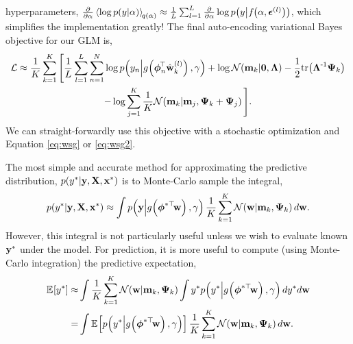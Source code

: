 \documentclass[11pt, oneside]{article}
\begin{document}
hyperparameters, $\frac{\partial}{\partial \alpha} \left\langle{\log
    \ensuremath{p\!\left({y}\middle\vert{\alpha}\right)}}\right\rangle_{\!{q(\alpha)}} \approx \frac{1}{L} \sum^L_{l=1}
\frac{\partial}{\partial\alpha} \log p\!\left({y}\middle\vert{\ensuremath{{f}_{}\!\left({{\alpha,
        \boldsymbol\epsilon^{(l)}}}\right)}}\right)$, which simplifies the implementation greatly! The
final auto-encoding variational Bayes objective for our GLM is,
\begin{multline}
    \mathcal{L} \approx \frac{1}{K} \sum^K_{k=1} \Bigg[
    \frac{1}{L} \sum^L_{l=1} \sum^N_{n=1} 
    \log p\!\left({y_n}\middle\vert{\ensuremath{{g}_{}\!\left({{\boldsymbol\phi_n^{\!\top} \hat{\mathbf{w}}_k^{\left({l}\right)}}}\right)}, \ensuremath{\gamma}}\right)
    + \log\mathcal{N}\!\left({\mathbf{m}_k}\middle\vert{\mathbf{0}, \ensuremath{\boldsymbol{\Lambda}}}\right)
    - \frac{1}{2} \text{tr}\!\left({\boldsymbol{\Lambda}^{\text{-}1}\boldsymbol{\Psi}_k}\right) \\
    - \log \sum_{j=1}^K \frac{1}{K}
    \mathcal{N}\!\left({\mathbf{m}_k}\middle\vert{\ensuremath{\mathbf{m}}_j, \ensuremath{\boldsymbol{\Psi}}_k + \ensuremath{\boldsymbol{\Psi}}_j}\right)
    \Bigg].
    \label{eq:glmobj_exp}
\end{multline}
We can straight-forwardly use this objective with a stochastic optimization
and Equation \eqref{eq:wsg} or \eqref{eq:wsg2}.

The most simple and accurate method for approximating the predictive
distribution, $p\!\left({y^{*}}\middle\vert{\ensuremath{\mathbf{y}}, \ensuremath{\mathbf{X}}, \ensuremath{\mathbf{x}}\ensuremath{^{*}}}\right)$ is to Monte-Carlo
sample the integral,
\begin{equation}
    p\!\left({y^{*}}\middle\vert{\ensuremath{\mathbf{y}}, \ensuremath{\mathbf{X}}, \ensuremath{\mathbf{x}}\ensuremath{^{*}}}\right) \approx
    \int p\!\left({\mathbf{y}}\middle\vert{\ensuremath{{g}_{}\!\left({{\boldsymbol\phi^{*\top}\!\mathbf{w}}}\right)}, \ensuremath{\gamma}}\right)
    \frac{1}{K} \sum^K_{k=1} \mathcal{N}\!\left({\mathbf{w}}\middle\vert{\ensuremath{\mathbf{m}}_k, \ensuremath{\boldsymbol{\Psi}}_k}\right) d \mathbf{w}.
    \label{eq:glppred}
\end{equation}
However, this integral is not particularly useful unless we wish to evaluate
known $\mathbf{y}^{*}$ under the model. For prediction, it is more useful to
compute (using Monte-Carlo integration) the predictive expectation, 
\begin{align}
    \expece{}{\targs\test} \approx&
    \int \frac{1}{K} \sum^K_{k=1} \gausC{\weights}{\pomean_k, \dpocov_k}
    \int \targs\test \probC{\targs\test}{\activ{\feats\testT\weights}, \lparam}
    d \targs\test d \weights
    \nonumber\\
    =& \int \expece{}{\probC{\targs\test}
        {\activ{\feats\testT\weights}, \lparam}}
    \frac{1}{K} \sum^K_{k=1} \gausC{\weights}{\pomean_k, \dpocov_k}
    d \weights.
    \label{eq:glmexpec}
\end{align}
\end{document}

